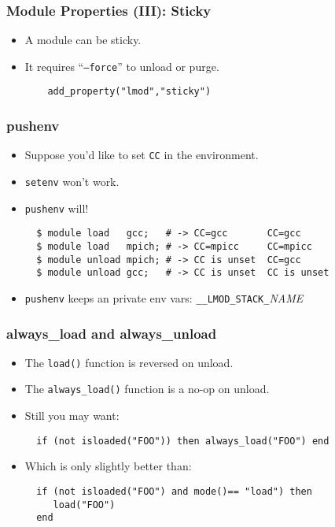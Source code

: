 \documentclass{beamer}
\begin{document}
\begin{frame}[fragile]
    \frametitle{Module Properties (III): Sticky}
  \begin{itemize}
    \item A module can be sticky.
    \item It requires ``\texttt{--force}'' to unload or purge.
    {\small
\begin{verbatim}
    add_property("lmod","sticky")
\end{verbatim}
}
  \end{itemize}
\end{frame}





\begin{frame}[fragile]
    \frametitle{pushenv}
  \begin{itemize}
    \item Suppose you'd like to set \texttt{CC} in the environment.
    \item \texttt{setenv} won't work.
    \item \texttt{pushenv} will!
    {\small
\begin{verbatim}
  $ module load   gcc;   # -> CC=gcc       CC=gcc
  $ module load   mpich; # -> CC=mpicc     CC=mpicc
  $ module unload mpich; # -> CC is unset  CC=gcc
  $ module unload gcc;   # -> CC is unset  CC is unset
\end{verbatim}
}
    \item \texttt{pushenv} keeps an private env vars: \texttt{\_\_LMOD\_STACK\_}\emph{NAME}
  \end{itemize}
\end{frame}

\begin{frame}[fragile]
    \frametitle{always\_load and always\_unload}
  \begin{itemize}
    \item The \texttt{load()} function is reversed on unload.
    \item The \texttt{always\_load()} function is a no-op on unload.
    \item Still you may want:
    {\small
\begin{verbatim}
  if (not isloaded("FOO")) then always_load("FOO") end
\end{verbatim}
}
    \item Which is only slightly better than:
    {\small
\begin{verbatim}
  if (not isloaded("FOO") and mode()== "load") then
     load("FOO")
  end
\end{verbatim}
}
  \end{itemize}
\end{frame}
\end{document}
